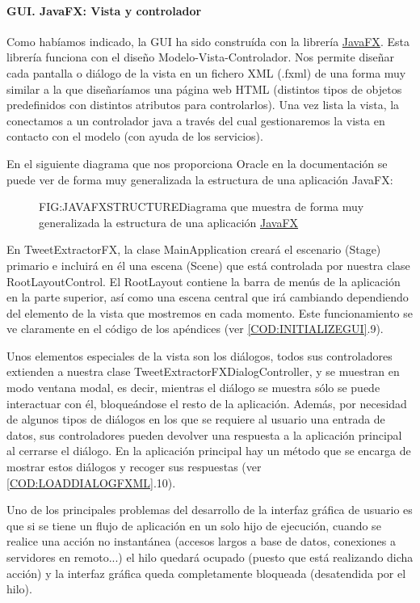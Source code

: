 \paragraph{GUI. JavaFX: Vista y controlador}
Como habíamos indicado, la GUI ha sido construída con la librería \href{https://openjfx.io/}{JavaFX}. Esta librería funciona con el diseño Modelo-Vista-Controlador. Nos permite diseñar cada pantalla o diálogo de la vista en un fichero XML (.fxml) de una forma muy similar a la que diseñaríamos una página web HTML (distintos tipos de objetos predefinidos con distintos atributos para controlarlos).
Una vez lista la vista, la conectamos a un controlador java a través del cual gestionaremos la vista en contacto con el modelo (con ayuda de los servicios).

En el siguiente diagrama que nos proporciona Oracle en la documentación se puede ver de forma muy generalizada la estructura de una aplicación JavaFX:


\begin{figure}[Estructura de una aplicación JavaFX]{FIG:JAVAFXSTRUCTURE}{Diagrama que muestra de forma muy generalizada la estructura de una aplicación \href{https://openjfx.io/}{JavaFX}}
\end{figure}

En TweetExtractorFX, la clase MainApplication creará el escenario (Stage) primario e incluirá en él una escena (Scene) que está controlada por nuestra clase RootLayoutControl. El RootLayout contiene la barra de menús de la aplicación en la parte superior, así como una escena central que irá cambiando dependiendo del elemento de la vista que mostremos en cada momento. Este funcionamiento se ve claramente en el código de los apéndices (ver \cref{COD:INITIALIZEGUI}.9).

Unos elementos especiales de la vista son los diálogos, todos sus controladores extienden a nuestra clase TweetExtractorFXDialogController, y se muestran en modo ventana modal, es decir, mientras el diálogo se muestra sólo se puede interactuar con él, bloqueándose el resto de la aplicación. Además, por necesidad de algunos tipos de diálogos en los que se requiere al usuario una entrada de datos, sus controladores pueden devolver una respuesta a la aplicación principal al cerrarse el diálogo. En la aplicación principal hay un método que se encarga de mostrar estos diálogos y recoger sus respuestas (ver \cref{COD:LOADDIALOGFXML}.10). \newpage

Uno de los principales problemas del desarrollo de la interfaz gráfica de usuario es que si se tiene un flujo de aplicación en un solo hijo de ejecución, cuando se realice una acción no instantánea (accesos largos a base de datos, conexiones a servidores en remoto...) el hilo quedará ocupado (puesto que está realizando dicha acción) y la interfaz gráfica queda completamente bloqueada (desatendida por el hilo).

